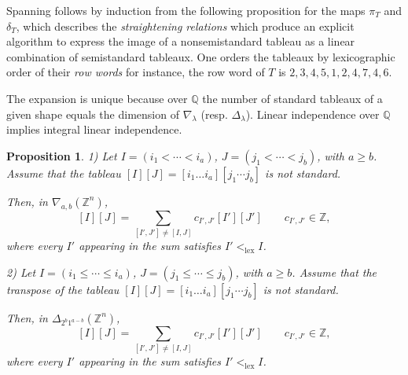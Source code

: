 \documentclass[10pt]{amsart}
\newtheorem{proposition}[theorem]{Proposition}
\theoremstyle{definition}
\theoremstyle{remark}
\newcommand{\Z}{\mathbb Z}
\newcommand{\Q}{\mathbb Q}
\begin{document}
Spanning follows by induction from the following proposition for the maps $\pi_T$ and $\delta_T$, which describes the {\em straightening relations}  which produce an explicit algorithm to express the image of a nonsemistandard  tableau as a linear combination of semistandard  tableaux. One orders the tableaux by lexicographic order of their {\em row words}  for instance, the  row word of $T$  is $2,3,4,5,1,2,4,7,4,6$.
\smallskip

 The expansion is unique because over $\Q$ the number of standard tableaux of a given shape equals the dimension of $\nabla_\lambda$ (resp. $\Delta_\lambda$). Linear independence over $\Q$ implies integral linear independence.
\begin{proposition}\label{eze} 1) Let $I=(i_1<\cdots< i_a)$,
$J=(j_1<\cdots< j_b)$, with $a\ge b$. Assume that the tableau $[I][J]=[i_1\ldots i_a][j_1\cdots j_b]$ is not standard. \smallskip

Then,  in $\nabla_{a,b}(\Z^n)$,
\begin{equation}\label{eq:tri-schur}
 [I][J]=\sum_{[I',J']\ne[I,J]}c_{I',J'}[I'][J']
 \qquad c_{I',J'}\in\mathbb{Z},
\end{equation}  where every $I'$ appearing in the sum satisfies $I'<_{\mathrm{lex}}I$.\medskip

2) Let $I=(i_1\le\cdots\le i_a)$,
$J=(j_1\le\cdots\le j_b)$, with $a\ge b$. Assume that the transpose of the tableau $[I][J]=[i_1\ldots i_a][j_1\cdots j_b]$ is not standard.  \smallskip

Then,  in $\Delta_{2^b1^{a-b}}(\Z^n)$,
\begin{equation}\label{eq:tri}
 [I][J]=\sum_{[I',J']\ne[I,J]}c_{I',J'}[I'][J']
 \qquad c_{I',J'}\in\mathbb{Z},
\end{equation}  where every $I'$ appearing in the sum satisfies $I'<_{\mathrm{lex}}I$.
\end{proposition}
\end{document}
